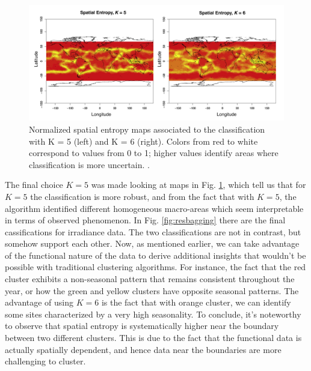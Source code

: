 \begin{figure}[H]
    \centering
    \includegraphics[scale=0.5]{Images/irrentropy.png}
    \caption[Spatial entropy for irradiance data.]{Normalized spatial entropy maps associated to the classification with K = 5 (left) and K = 6 (right). Colors from red to white correspond to values from 0 to 1; higher values identify areas where classification is more uncertain. \cite{secchi_bagging_2013}.}
    \label{fig:irrentropy}
\end{figure}
The final choice $K=5$ was made looking at maps in Fig. \ref{fig:irrentropy}, which tell us that for $K=5$ the classification is more robust, and from the fact that with $K=5$, the algorithm identified different homogeneous macro-areas which seem interpretable in terms of observed phenomenon.  In Fig. \ref{fig:resbagging} there are the final cassifications for irradiance data. The two classifications are not in contrast, but somehow support each other. Now, as mentioned earlier, we can take advantage of the functional nature of the data to derive additional insights that wouldn't be possible with traditional clustering algorithms. For instance, the fact that the red cluster exhibits a non-seasonal pattern that remains consistent throughout the year, or how the green and yellow clusters have opposite seasonal patterns. The advantage of using $K=6$ is the fact that with orange cluster, we can identify some sites characterized by a very high seasonality. To conclude, it's noteworthy to observe that spatial entropy is systematically higher near the boundary between two different clusters. This is due to the fact that the functional data is actually spatially dependent, and hence data near the boundaries are more challenging to cluster.
